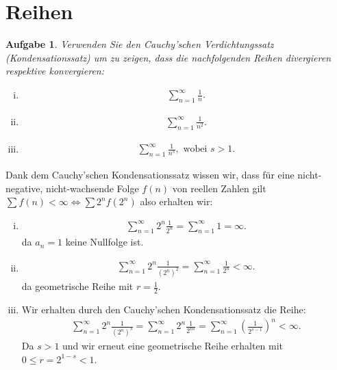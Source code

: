 \documentclass[a4paper, 20]{exam}
\newtheorem{ex}{Aufgabe}
\begin{document}
\newpage
\section{Reihen}


\begin{ex} Verwenden Sie den Cauchy'schen Verdichtungssatz (Kondensationssatz) um zu zeigen, dass die nachfolgenden Reihen divergieren respektive konvergieren:
\begin{enumerate}[i)]
\item \begin{align*}
\sum_{n=1}^\infty \frac{1}{n}.
\end{align*}
\item \begin{align*}
\sum_{n=1}^\infty \frac{1}{n^2}.
\end{align*}

\item 
\begin{align*}
 \sum_{n=1}^\infty \frac{1}{n^s}, \text{ wobei } s >1. 
\end{align*}

\end{enumerate}

\end{ex}


\begin{solution} Dank dem Cauchy'schen Kondensationssatz wissen wir, dass für eine nicht-negative, nicht-wachsende Folge $f(n)$ von reellen Zahlen gilt $\sum f(n) < \infty \iff \sum 2^n f(2^n)$ also erhalten wir:
\begin{enumerate}[i)]
\item 
\begin{align*}
\sum_{n=1}^\infty 2^n \frac{1}{2^n} = \sum_{n=1}^\infty 1 = \infty.
\end{align*}
da $a_n=1$ keine Nullfolge ist.
\item 
\begin{align*}
\sum_{n=1}^\infty 2^n \frac{1}{(2^n)^2 } = \sum_{n=1}^\infty \frac{1}{2^n}< \infty.
\end{align*}
da geometrische Reihe mit $r= \frac{1}{2}$. 

\item Wir erhalten durch den Cauchy'schen Kondensationssatz die Reihe:
\begin{align*}
 \sum_{n=1}^\infty 2^n \frac{1}{(2^n)^s} = \sum_{n=1}^\infty 2^n \frac{1}{2^{ns}} = \sum_{n=1}^\infty \left(\frac{1}{2^{s-1}}\right)^n < \infty.
\end{align*}
Da $s>1$ und wir erneut eine geometrische Reihe erhalten mit $0 \leq r = 2^{1-s} <1$. 
\end{enumerate}

\end{solution}
\end{document}

